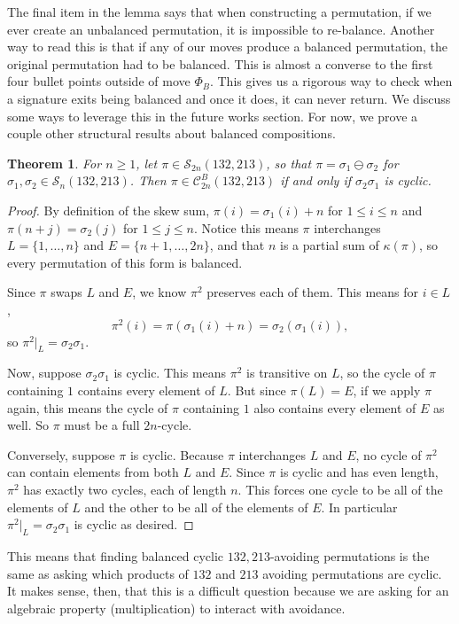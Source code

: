\documentclass[11pt]{article}
\renewcommand\S{\mathcal S}
\newcommand\C{\mathcal C}
\newtheorem{theorem}{Theorem}[section]
\theoremstyle{definition}
\begin{document}
The final item in the lemma says that when constructing a permutation, if we ever create an unbalanced permutation, it is impossible to re-balance. Another way to read this is that if any of our moves produce a balanced permutation, the original permutation had to be balanced. This is almost a converse to the first four bullet points outside of move $\Phi_B$. This gives us a rigorous way to check when a signature exits being balanced and once it does, it can never return. We discuss some ways to leverage this in the future works section. For now, we prove a couple other structural results about balanced compositions.

\begin{theorem} \label{thm: product}
    For $n \geq 1$, let $\pi \in \S_{2n}(132,213)$, so that $\pi = \sigma_1 \ominus \sigma_2$ for $\sigma_1,\sigma_2 \in \S_n(132,213)$. Then $\pi \in \C_{2n}^B(132,213)$ if and only if $\sigma_2 \sigma_1$ is cyclic.
\end{theorem}

\begin{proof}
    By definition of the skew sum, $\pi(i) = \sigma_1(i) + n$ for $1 \le i \le n$ and $\pi(n+j) = \sigma_2(j)$ for $1 \le j \le n$. Notice this means $\pi$ interchanges $L = \{1,\dots,n\}$ and $E = \{n+1,\dots,2n\}$, and that $n$ is a partial sum of $\kappa(\pi)$, so every permutation of this form is balanced.

    Since $\pi$ swaps $L$ and $E$, we know $\pi^2$ preserves each of them. This means for $i \in L$,
    \[
    \pi^2(i) = \pi(\sigma_1(i)+n) = \sigma_2(\sigma_1(i)),
    \]
    so $\pi^2|_L = \sigma_2\sigma_1$.

    Now, suppose $\sigma_2\sigma_1$ is cyclic. This means $\pi^2$ is transitive on $L$, so the cycle of $\pi$ containing $1$ contains every element of $L$. But since $\pi(L) =E$, if we apply $\pi$ again, this means the cycle of $\pi$ containing $1$ also contains every element of $E$ as well. So $\pi$ must be a full $2n$-cycle.

    Conversely, suppose $\pi$ is cyclic. Because $\pi$ interchanges $L$ and $E$, no cycle of $\pi^2$ can contain elements from both $L$ and $E$. Since $\pi$ is cyclic and has even length, $\pi^2$ has exactly two cycles, each of length $n$. This forces one cycle to be all of the elements of $L$ and the other to be all of the elements of $E$. In particular $\pi^2|_L = \sigma_2\sigma_1$ is cyclic as desired.
\end{proof}

This means that finding balanced cyclic $132,213$-avoiding permutations is the same as asking which products of $132$ and $213$ avoiding permutations are cyclic. It makes sense, then, that this is a difficult question because we are asking for an algebraic property (multiplication) to interact with avoidance.
\end{document}
